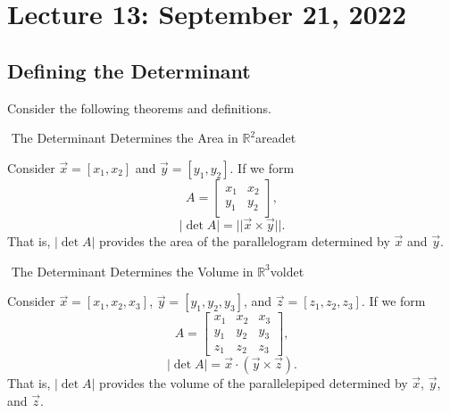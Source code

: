 \section{Lecture 13: September 21, 2022}

    \subsection{Defining the Determinant}

        Consider the following theorems and definitions.
        \begin{theorem}{\Stop\,\,The Determinant Determines the Area in \(\mathbb{R}^2\)}{areadet}

            Consider \(\vec{x}=[x_1,x_2]\) and \(\vec{y}=[y_1,y_2]\). If we form
            \begin{equation*}
                A=\begin{bmatrix}
                    x_1 & x_2 \\
                    y_1 & y_2 
                \end{bmatrix},
            \end{equation*}
            \begin{equation*}
                |\det A| = ||\vec{x}\times\vec{y}||.
            \end{equation*}
            That is, \(|\det A|\) provides the area of the parallelogram determined by \(\vec{x}\) and \(\vec{y}\).
            
        \end{theorem}
        \begin{theorem}{\Stop\,\,The Determinant Determines the Volume in \(\mathbb{R}^3\)}{voldet}

            Consider \(\vec{x}=[x_1,x_2,x_3]\), \(\vec{y}=[y_1,y_2,y_3]\), and \(\vec{z}=[z_1,z_2,z_3]\). If we form
            \begin{equation*}
                A=\begin{bmatrix}
                    x_1 & x_2 & x_3 \\
                    y_1 & y_2 & y_3 \\
                    z_1 & z_2 & z_3
                \end{bmatrix},
            \end{equation*}
            \begin{equation*}
                |\det A| = \vec{x}\cdot(\vec{y}\times\vec{z}).
            \end{equation*}
            That is, \(|\det A|\) provides the volume of the parallelepiped determined by \(\vec{x}\), \(\vec{y}\), and \(\vec{z}\).
            
        \end{theorem}
